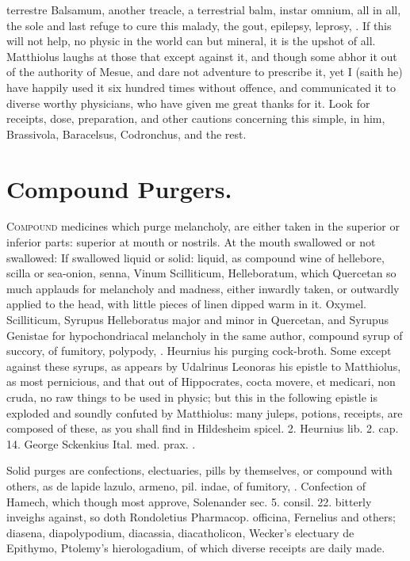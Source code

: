 {terrestre Balsamum, another treacle, a terrestrial balm, instar omnium,
all in all, the sole and last refuge to cure this malady, the
gout, epilepsy, leprosy, \etc{}. If this will not help, no physic in the
world can but mineral, it is the upshot of all. Matthiolus laughs at
those that except against it, and though some abhor it out of the
authority of Mesue, and dare not adventure to prescribe it, yet I
(saith he) have happily used it six hundred times without offence, and
communicated it to diverse worthy physicians, who have given me great
thanks for it. Look for receipts, dose, preparation, and other cautions
concerning this simple, in him, Brassivola, Baracelsus, Codronchus, and
the rest.

\section{Compound Purgers.}

\lettrine{C}{ompound} medicines which purge melancholy, are either taken in the
superior or inferior parts: superior at mouth or nostrils. At the mouth
swallowed or not swallowed: If swallowed liquid or solid: liquid, as
compound wine of hellebore, scilla or sea-onion, senna, Vinum
Scilliticum, Helleboratum, which Quercetan so much applauds for
melancholy and madness, either inwardly taken, or outwardly applied to
the head, with little pieces of linen dipped warm in it. Oxymel.
Scilliticum, Syrupus Helleboratus major and minor in Quercetan, and
Syrupus Genistae for hypochondriacal melancholy in the same author,
compound syrup of succory, of fumitory, polypody, \etc{}. Heurnius his
purging cock-broth. Some except against these syrups, as appears by
Udalrinus Leonoras his epistle to Matthiolus, as most pernicious,
and that out of Hippocrates, cocta movere, et medicari, non cruda, no
raw things to be used in physic; but this in the following epistle is
exploded and soundly confuted by Matthiolus: many juleps, potions,
receipts, are composed of these, as you shall find in Hildesheim
spicel. 2. Heurnius lib. 2. cap. 14. George Sckenkius Ital. med. prax.
\etc{}.

Solid purges are confections, electuaries, pills by themselves, or
compound with others, as de lapide lazulo, armeno, pil. indae, of
fumitory, \etc{}. Confection of Hamech, which though most approve,
Solenander sec. 5. consil. 22. bitterly inveighs against, so doth
Rondoletius Pharmacop. officina, Fernelius and others; diasena,
diapolypodium, diacassia, diacatholicon, Wecker's electuary de
Epithymo, Ptolemy's hierologadium, of which diverse receipts are daily
made.

}
